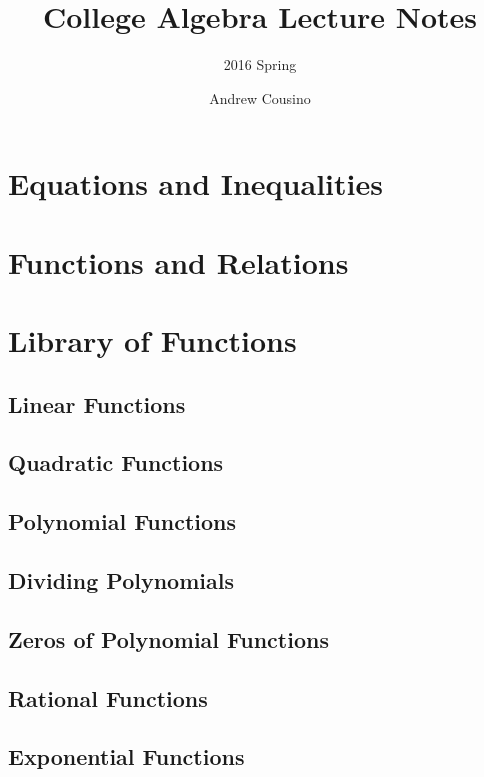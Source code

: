 \documentclass[oneside]{scrbook}
\begin{document}
\title{College Algebra Lecture Notes}
\subtitle{2016 Spring}
\author{Andrew Cousino}
\maketitle

\frontmatter
\tableofcontents
\listoffigures
\listoftables

\mainmatter
\part{Equations and Inequalities}







\part{Functions and Relations}






\part{Library of Functions}
\chapter{Linear Functions}
\chapter{Quadratic Functions}
\chapter{Polynomial Functions}
\chapter{Dividing Polynomials}
\chapter{Zeros of Polynomial Functions}
\chapter{Rational Functions}
\chapter{Exponential Functions}
\end{document}
